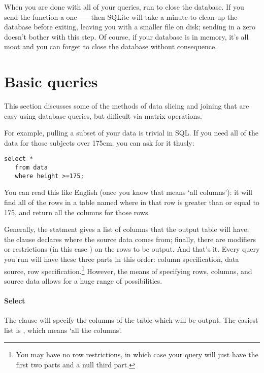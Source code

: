 When you are done with all of your queries, run
 to close the database. If you send the function a
one------then SQLite will take a minute to clean
up the database before exiting, leaving you with a smaller file on disk;
sending in a zero doesn't bother with this step. Of course, if your
database is in memory, it's all moot and you can forget to close the
database without consequence.

\section{Basic queries}
This section discusses some of the methods of data slicing and joining
that are easy using database queries, but difficult via
matrix operations.

For example, pulling a subset of your data is trivial in SQL. If
you need all of the data for those subjects over 175cm, you can ask for
it thusly:

\begin{lstlisting}
select * 
   from data 
   where height >=175;
\end{lstlisting}

You can read this like English (once you know that \sinline{*} means `all
columns'): it will find all of the rows in a table named 
where  in that row is greater than or equal to 175, and
return all the columns for those rows.


Generally, the  statment gives a list of columns that
the output table will have; the  clause declares where the
source data comes from; finally, there are modifiers or restrictions
(in this case ) on the rows to be output.  And that's
it. Every query you run will have these three parts in this order: column
specification, data source, row specification.\footnote{You may have no
row restrictions, in which case your query will just have the first two
parts and a null third part.} However, the means of specifying rows,
columns, and source data allows for a huge range of possibilities.

\paragraph{Select}
The  clause will specify the columns of the table which will
be output. The easiest list is \sinline{*}, which means `all the columns'.

